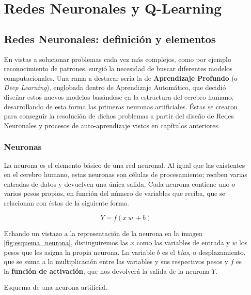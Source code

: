 \chapter{Redes Neuronales y Q-Learning}
\label{cap:deepLearning}


\section{Redes Neuronales: definición y elementos}
En vistas a solucionar problemas cada vez más complejos, como por ejemplo reconocimiento de patrones, surgió la necesidad de buscar diferentes modelos computacionales. Una rama a destacar sería la de \textbf{Aprendizaje Profundo} (o \textit{Deep Learning}), englobada dentro de Aprendizaje Automático, que decidió diseñar estos nuevos modelos basándose en la estructura del cerebro humano, desarrollando de esta forma las primeras neuronas artificiales. Éstas se crearon para conseguir la resolución de dichos problemas a partir del diseño de Redes Neuronales y procesos de auto-aprendizaje vistos en capítulos anteriores.

\subsection{Neuronas}
La neurona es el elemento básico de una red neuronal. Al igual que las existentes en el cerebro humano, estas neuronas son células de procesamiento; reciben varias entradas de datos y devuelven una única salida. Cada neurona contiene uno o varios pesos propios, en función del número de variables que reciba, que se relacionan con éstas de la siguiente forma.

$$Y = f(x\ w\ + b)$$

Echando un vistazo a la representación de la neurona en la imagen \ref{fig:esquema_neurona}, distinguiremos las $x$ como las variables de entrada y $w$ los pesos que les asigna la propia neurona. La variable $b$ es el \textit{bias}, o desplazamiento, que se suma a la multiplicación entre las variables y sus respectivos pesos y $f$ es la \textbf{función de activación}, que nos devolverá la salida de la neurona $Y$.

%
       {Esquema de una neurona artificial.}

